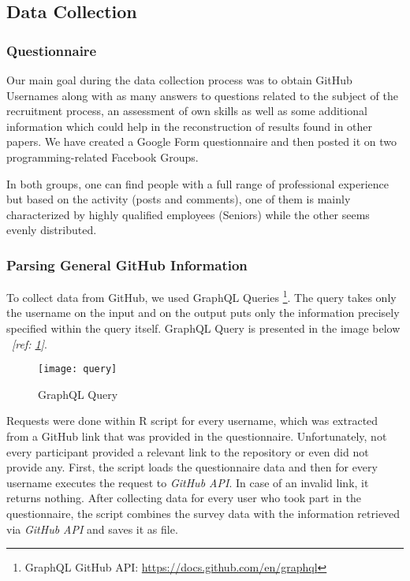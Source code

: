 \subsection{Data Collection}
\label{sec:data-collection}

\subsubsection{Questionnaire}
\label{sec:questionnaire}

Our main goal during the data collection process was to obtain GitHub Usernames along with as many answers to questions related to the subject of the recruitment process, an assessment of own skills as well as some additional information which could help in the reconstruction of results found in other papers. We have created a Google Form questionnaire and then posted it on two programming-related Facebook Groups.

In both groups, one can find people with a full range of professional experience but based on the activity (posts and comments), one of them is mainly characterized by highly qualified employees (Seniors) while the other seems evenly distributed.

\subsubsection{Parsing General GitHub Information}
\label{sec:github-info-parsing}

To collect data from GitHub, we used GraphQL Queries \footnote{GraphQL GitHub API: \url{https://docs.github.com/en/graphql}}. The query takes only the username on the input and on the output puts only the information precisely specified within the query itself. GraphQL Query is presented in the image below ~\textit{[ref: \ref{fig:graph-ql-query}]}.

\begin{figure}[htp]
\centering
\texttt{[image: query]}
\caption{GraphQL Query}
\label{fig:graph-ql-query}
\end{figure}


Requests were done within R script for every username, which was extracted from a GitHub link that was provided in the questionnaire. Unfortunately, not every participant provided a relevant link to the repository or even did not provide any. First, the script loads the questionnaire data and then for every username executes the request to \emph{GitHub API}. In case of an invalid link, it returns nothing. After collecting data for every user who took part in the questionnaire, the script combines the survey data with the information retrieved via \emph{GitHub API} and saves it as  file.



